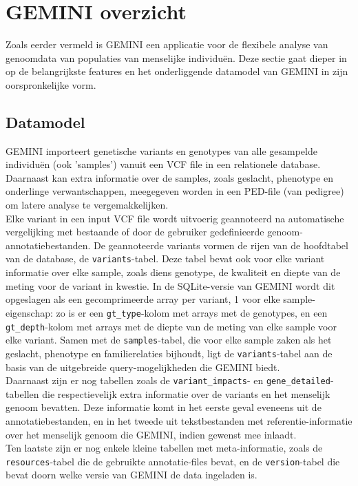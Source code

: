 \chapter{GEMINI overzicht}
\label{cha3}

Zoals eerder vermeld is GEMINI een applicatie voor de flexibele analyse van genoomdata van populaties van menselijke individu\"en. Deze sectie gaat dieper in op de belangrijkste features en het onderliggende datamodel van GEMINI in zijn oorspronkelijke vorm.

\section{Datamodel}

GEMINI importeert genetische variants en genotypes van alle gesampelde individu\"en (ook 'samples') vanuit een VCF file in een relationele database.
Daarnaast kan extra informatie over de samples, zoals geslacht, phenotype en onderlinge verwantschappen, meegegeven worden in een PED-file (van pedigree) om latere analyse te vergemakkelijken.\\

Elke variant in een input VCF file wordt uitvoerig geannoteerd na automatische vergelijking met bestaande of door de gebruiker gedefinieerde genoom-annotatiebestanden. De geannoteerde variants vormen de rijen van de hoofdtabel van de database, de \texttt{variants}-tabel. Deze tabel bevat ook voor elke variant informatie over elke sample, zoals diens genotype, de kwaliteit en diepte van de meting voor de variant in kwestie. In de SQLite-versie van GEMINI wordt dit opgeslagen als een gecomprimeerde array per variant, 1 voor elke sample-eigenschap: zo is er een \texttt{gt\_type}-kolom met arrays met de genotypes, en een \texttt{gt\_depth}-kolom met arrays met de diepte van de meting van elke sample voor elke variant. Samen met de \texttt{samples}-tabel, die voor elke sample zaken als het geslacht, phenotype en familierelaties bijhoudt, ligt de \texttt{variants}-tabel aan de basis van de uitgebreide query-mogelijkheden die GEMINI biedt.\\

Daarnaast zijn er nog tabellen zoals de \texttt{variant\_impacts}- en \texttt{gene\_detailed}-tabellen die respectievelijk extra informatie over de variants en het menselijk genoom bevatten. Deze informatie komt in het eerste geval eveneens uit de annotatiebestanden, en in het tweede uit tekstbestanden met referentie-informatie over het menselijk genoom die GEMINI, indien gewenst mee inlaadt.\\
Ten laatste zijn er nog enkele kleine tabellen met meta-informatie, zoals de \texttt{resources}-tabel die de gebruikte annotatie-files bevat, en de \texttt{version}-tabel die bevat doorn welke versie van GEMINI de data ingeladen is.\\\\

